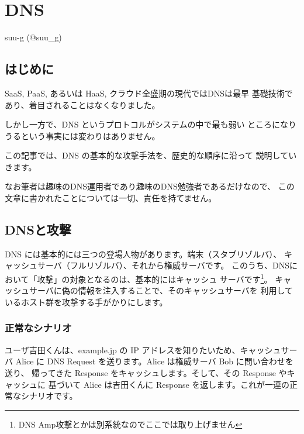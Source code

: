 
\chapter{DNS}

\begin{flushright}
 {\headfont suu-g (@suu\_g)}
\end{flushright}

\section{はじめに}


SaaS, PaaS, あるいは HaaS, クラウド全盛期の現代ではDNSは最早
基礎技術であり、着目されることはなくなりました。

しかし一方で、DNS というプロトコルがシステムの中で最も弱い
ところになりうるという事実には変わりはありません。

この記事では、DNS の基本的な攻撃手法を、歴史的な順序に沿って
説明していきます。

なお筆者は趣味のDNS運用者であり趣味のDNS勉強者であるだけなので、
この文章に書かれたことについては一切、責任を持てません。

\section{DNSと攻撃}

DNS には基本的には三つの登場人物があります。端末（スタブリゾルバ）、
キャッシュサーバ（フルリゾルバ）、それから権威サーバです。
このうち、DNSにおいて「攻撃」の対象となるのは、基本的にはキャッシュ
サーバです\footnote{DNS Amp攻撃とかは別系統なのでここでは取り上げません}。
キャッシュサーバに偽の情報を注入することで、そのキャッシュサーバを
利用しているホスト群を攻撃する手がかりにします。

\subsection{正常なシナリオ}
ユーザ吉田くんは、example.jp の IP アドレスを知りたいため、キャッシュサーバ
Alice に DNS Request を送ります。Alice は権威サーバ Bob に問い合わせを送り、
帰ってきた Response をキャッシュします。そして、その Response やキャッシュに
基づいて Alice は吉田くんに Response を返します。これが一連の正常なシナリオです。

